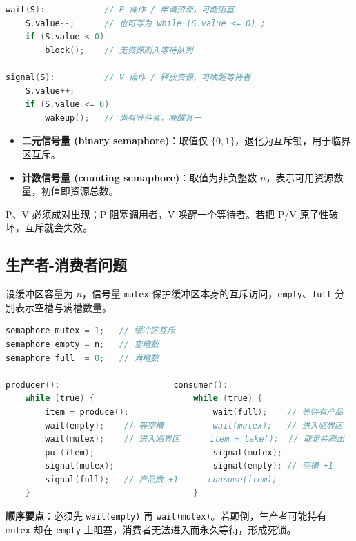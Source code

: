 \begin{lstlisting}[language=C, caption={信号量的 wait (P) 与 signal (V)}]
wait(S):            // P 操作 / 申请资源，可能阻塞
    S.value--;      // 也可写为 while (S.value <= 0) ;
    if (S.value < 0)
        block();    // 无资源则入等待队列

signal(S):          // V 操作 / 释放资源，可唤醒等待者
    S.value++;
    if (S.value <= 0)
        wakeup();   // 尚有等待者，唤醒其一
\end{lstlisting}

\begin{itemize}
    \item \textbf{二元信号量 (binary semaphore)}：取值仅 $\{0,1\}$，退化为互斥锁，用于临界区互斥。
    \item \textbf{计数信号量 (counting semaphore)}：取值为非负整数 $n$，表示可用资源数量，初值即资源总数。
\end{itemize}

P、V 必须成对出现；P 阻塞调用者，V 唤醒一个等待者。若把 P/V 原子性破坏，互斥就会失效。

\subsection{生产者-消费者问题}

设缓冲区容量为 $n$，信号量 \texttt{mutex} 保护缓冲区本身的互斥访问，\texttt{empty}、\texttt{full} 分别表示空槽与满槽数量。

\begin{lstlisting}[language=C, caption={生产者-消费者（有限缓冲区）}]
semaphore mutex = 1;   // 缓冲区互斥
semaphore empty = n;   // 空槽数
semaphore full  = 0;   // 满槽数

producer():                       consumer():
    while (true) {                    while (true) {
        item = produce();                 wait(full);    // 等待有产品
        wait(empty);    // 等空槽          wait(mutex);   // 进入临界区
        wait(mutex);    // 进入临界区      item = take();  // 取走并腾出
        put(item);                        signal(mutex);
        signal(mutex);                    signal(empty); // 空槽 +1
        signal(full);   // 产品数 +1      consume(item);
    }                                 }
\end{lstlisting}

\textbf{顺序要点}：必须先 \texttt{wait(empty)} 再 \texttt{wait(mutex)}。若颠倒，生产者可能持有 \texttt{mutex} 却在 \texttt{empty} 上阻塞，消费者无法进入而永久等待，形成死锁。


